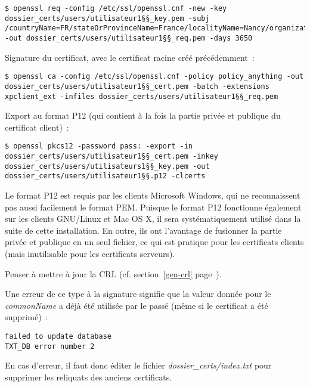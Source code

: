 \begin{lstlisting}
$ openssl req -config /etc/ssl/openssl.cnf -new -key dossier_certs/users/utilisateur1§§_key.pem -subj /countryName=FR/stateOrProvinceName=France/localityName=Nancy/organizationName=BHConsulting/commonName=utilisateur1/ -out dossier_certs/users/utilisateur1§§_req.pem -days 3650
\end{lstlisting}

Signature du certificat, avec le certificat racine créé précédemment~:

\begin{lstlisting}
$ openssl ca -config /etc/ssl/openssl.cnf -policy policy_anything -out dossier_certs/users/utilisateur1§§_cert.pem -batch -extensions xpclient_ext -infiles dossier_certs/users/utilisateur1§§_req.pem
\end{lstlisting}

Export au format P12 (qui contient à la fois la partie privée et publique du certificat client)~:

\begin{lstlisting}
$ openssl pkcs12 -password pass: -export -in dossier_certs/users/utilisateur1§§_cert.pem -inkey dossier_certs/users/utilisateurs1§§_key.pem -out dossier_certs/users/utilisateur1§§.p12 -clcerts
\end{lstlisting}

{\Large\Info} Le format P12 est requis par les clients Microsoft Windows, qui ne reconnaissent pas aussi facilement le format PEM. Puisque le format P12 fonctionne également sur les clients GNU/Linux et Mac OS X, il sera systématiquement utilisé dans la suite de cette installation. En outre, ils ont l'avantage de fusionner la partie privée et publique en un seul fichier, ce qui est pratique pour les certificats clients (mais inutilisable pour les certificats serveurs).

Penser à mettre à jour la CRL (cf. section~\ref{gen-crl} page~\pageref{gen-crl}).

Une erreur de ce type à la signature signifie que la valeur donnée pour le \emph{commonName} a déjà été utilisée par le passé (même si le certificat a été supprimé)~:

\begin{lstlisting}
failed to update database
TXT_DB error number 2
\end{lstlisting}

En cas d'erreur, il faut donc éditer le fichier \emph{dossier\_certs/index.txt} pour supprimer les reliquats des anciens certificats.

